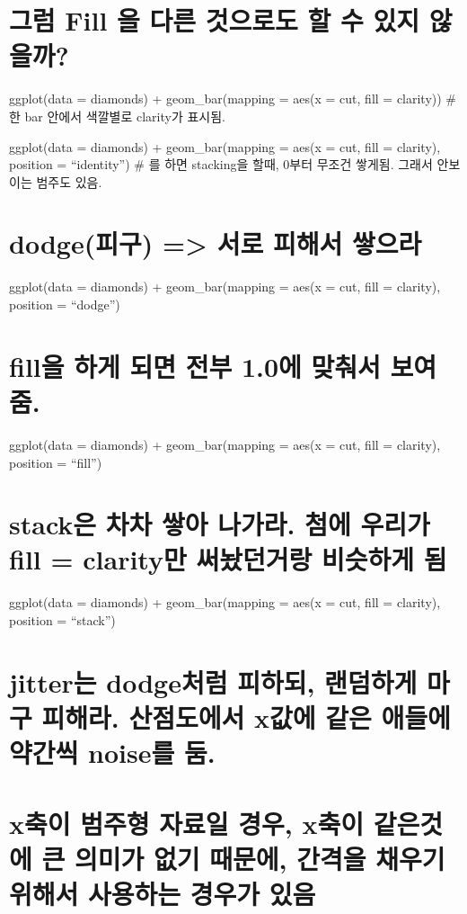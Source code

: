 \documentclass[]{article}
\begin{document}
\section{그럼 Fill 을 다른 것으로도 할 수 있지
않을까?}\label{-fill-------}

ggplot(data = diamonds) + geom\_bar(mapping = aes(x = cut, fill =
clarity)) \# 한 bar 안에서 색깔별로 clarity가 표시됨.

ggplot(data = diamonds) + geom\_bar(mapping = aes(x = cut, fill =
clarity), position = ``identity'') \# 를 하면 stacking을 할때, 0부터
무조건 쌓게됨. 그래서 안보이는 범주도 있음.

\section{dodge(피구) =\textgreater{} 서로 피해서 쌓으라}\label{dodge---}

ggplot(data = diamonds) + geom\_bar(mapping = aes(x = cut, fill =
clarity), position = ``dodge'')

\section{fill을 하게 되면 전부 1.0에 맞춰서
보여줌.}\label{fill----1.0--.}

ggplot(data = diamonds) + geom\_bar(mapping = aes(x = cut, fill =
clarity), position = ``fill'')

\section{stack은 차차 쌓아 나가라. 첨에 우리가 fill = clarity만
써놨던거랑 비슷하게 됨}\label{stack---.---fill-clarity---}

ggplot(data = diamonds) + geom\_bar(mapping = aes(x = cut, fill =
clarity), position = ``stack'')

\section{jitter는 dodge처럼 피하되, 랜덤하게 마구 피해라. 산점도에서
x값에 같은 애들에 약간씩 noise를
둠.}\label{jitter-dodge----.--x----noise-.}

\section{x축이 범주형 자료일 경우, x축이 같은것에 큰 의미가 없기 때문에,
간격을 채우기 위해서 사용하는 경우가 있음}\label{x----x-----------}
\end{document}
